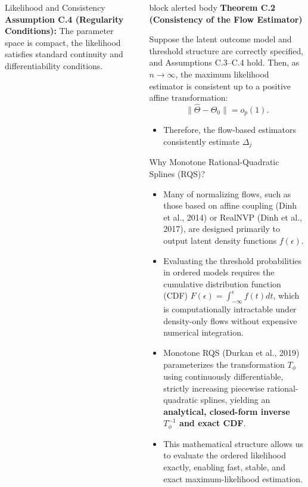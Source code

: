 \documentclass[final]{beamer}
\newlength{\sepwidth}
\newlength{\colwidth}
\newcommand{\separatorcolumn}{\begin{column}{\sepwidth}\end{column}}
\newcommand{\assumptionbox}[2]{%
\begin{beamercolorbox}[rounded=true,shadow=false,sep=0.6em,wd=\linewidth]{block alerted body}
\textbf{#1}\par\smallskip #2
\end{beamercolorbox}}
\begin{document}
\begin{frame}[t]
\begin{columns}[t,totalwidth=0.995\paperwidth]
\begin{column}{\colwidth}
\begin{block}{Likelihood and Consistency}
\vspace{0.3em}
\textbf{Assumption C.4 (Regularity Conditions):}
The parameter space is compact, the likelihood satisfies standard continuity and differentiability conditions.

\vspace{0.5em}
\end{block}

\end{column}
\separatorcolumn

\begin{column}{\colwidth}

\assumptionbox{Theorem C.2 (Consistency of the Flow Estimator)}{
Suppose the latent outcome model and threshold structure are correctly specified, and Assumptions C.3--C.4 hold. Then, as $n \to \infty$, the maximum likelihood estimator is consistent up to a positive affine transformation:
\[
\| \widehat{\Theta} - \Theta_0 \| = o_p(1).
\]
}

\begin{itemize}
  \item Therefore, the flow-based estimators consistently estimate $\Delta_{j}$ 
\end{itemize}

\begin{block}{Why Monotone Rational-Quadratic Splines (RQS)?}
\justifying
\begin{itemize}\setlength\itemsep{0.3em}
  \item Many of normalizing flows, such as those based on affine coupling (Dinh et al., 2014) or RealNVP (Dinh et al., 2017), are designed primarily to output latent density functions $f(\epsilon)$. 
  \item Evaluating the threshold probabilities in ordered models requires the cumulative distribution function (CDF) $F(\epsilon) = \int_{-\infty}^{\epsilon} f(t) dt$, which is computationally intractable under density-only flows without expensive numerical integration.
  \item Monotone RQS (Durkan et al., 2019) parameterizes the transformation $T_\phi$ using continuously differentiable, strictly increasing piecewise rational-quadratic splines, yielding an \textbf{analytical, closed-form inverse $T_\phi^{-1}$ and exact CDF}.
  \item This mathematical structure allows us to evaluate the ordered likelihood exactly, enabling fast, stable, and exact maximum-likelihood estimation.
\end{itemize}
\end{block}


\end{column}
\end{columns}
\end{frame}
\end{document}
